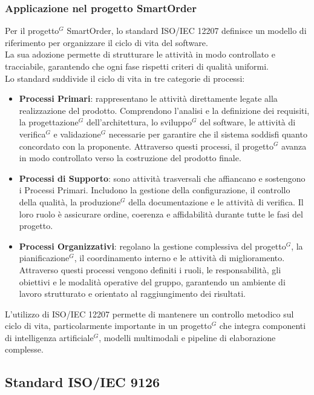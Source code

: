 \subsubsection{Applicazione nel progetto SmartOrder}
Per il progetto$^G$ SmartOrder, lo standard ISO/IEC 12207 definisce un modello di riferimento per organizzare il ciclo di vita del software.\\
La sua adozione permette di strutturare le attività in modo controllato e tracciabile, garantendo che ogni fase rispetti criteri di qualità uniformi.\\
Lo standard suddivide il ciclo di vita in tre categorie di processi:
\begin{itemize}
    \setlength\itemsep{-0.1em}
    \item \textbf{Processi Primari}: rappresentano le attività direttamente legate alla realizzazione del prodotto. Comprendono l’analisi e la definizione dei requisiti, la progettazione$^G$ dell’architettura, lo sviluppo$^G$ del software, le attività di verifica$^G$ e validazione$^G$ necessarie per garantire che il sistema soddisfi quanto concordato con la proponente. Attraverso questi processi, il progetto$^G$ avanza in modo controllato verso la costruzione del prodotto finale.
    \item \textbf{Processi di Supporto}: sono attività trasversali che affiancano e sostengono i Processi Primari. Includono la gestione della configurazione, il controllo della qualità, la produzione$^G$ della documentazione e le attività di verifica. Il loro ruolo è assicurare ordine, coerenza e affidabilità durante tutte le fasi del progetto.
    \item \textbf{Processi Organizzativi}: regolano la gestione complessiva del progetto$^G$, la pianificazione$^G$, il coordinamento interno e le attività di miglioramento. Attraverso questi processi vengono definiti i ruoli, le responsabilità, gli obiettivi e le modalità operative del gruppo, garantendo un ambiente di lavoro strutturato e orientato al raggiungimento dei risultati.
\end{itemize}
L’utilizzo di ISO/IEC 12207 permette di mantenere un controllo metodico sul ciclo di vita, particolarmente importante in un progetto$^G$ che integra componenti di intelligenza artificiale$^G$, modelli multimodali e pipeline di elaborazione complesse.

\subsection{Standard ISO/IEC 9126}
